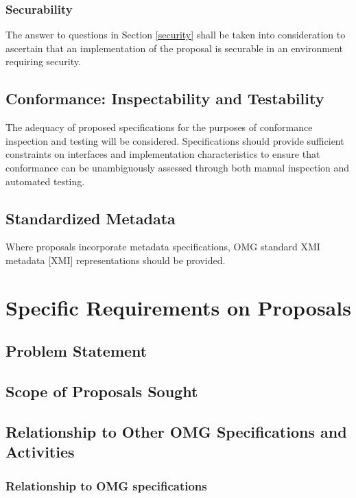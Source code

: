 \subsubsection{Securability}
The answer to questions in Section \ref{security} shall be taken into consideration to ascertain that an implementation of the proposal is securable in an environment requiring security.
\subsection{Conformance: Inspectability and Testability}
The adequacy of proposed specifications for the purposes of conformance inspection and testing will be considered. Specifications should provide sufficient constraints on interfaces and implementation characteristics to ensure that conformance can be unambiguously assessed through both manual inspection and automated testing.
\subsection{Standardized Metadata}
Where proposals incorporate metadata specifications, OMG standard XMI metadata [XMI] representations should be provided.


\section{Specific Requirements on Proposals}\label{specreqs}


\subsection{Problem Statement}\label{problemstmt}


\subsection{Scope of Proposals Sought}\label{scope}


\subsection{Relationship to Other OMG Specifications and Activities}
\subsubsection{Relationship to OMG specifications}


